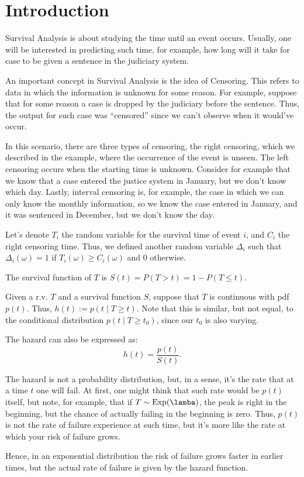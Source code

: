 \section{Introduction}

Survival Analysis is about studying the time until
an event occurs. Usually, one will be interested in
predicting such time, for example, how long will
it take for case to be given a sentence in the
judiciary system.

An important concept in Survival Analysis is the idea
of Censoring. This refers to data in which the information
is unknown for some reason. For example, suppose that
for some reason a case is dropped by the judiciary before
the sentence. Thus, the output for such case was ``censored''
since we can't observe when it would've occur.

In this scenario, there are three types of censoring,
the right censoring, which we described in the example,
where the occurrence of the event is unseen.
The left censoring occurs when the starting time is unknown.
Consider for example that we know that a case entered the
justice system in January, but we don't know which day.
Lastly, interval censoring is, for example,
the case in which we can only know the monthly information,
so we know the case entered in January, and it was sentenced
in December, but we don't know the day.

Let's denote $T_i$ the random variable for the survival time
of event $i$, and $C_i$ the right censoring time.
Thus, we defined another random variable $\Delta_i$
such that $\Delta_i(\omega) = 1$ if $T_i(\omega) \geq C_i(\omega)$
and 0 otherwise.

The survival function of $T$ is $S(t) = P(T>t) =1 - P(T\leq t)$.

\begin{definition}[Hazard]
	Given a r.v. $T$ and a survival function $S$,
	suppose that $T$ is continuous with pdf $p(t)$.
	Thus, $h(t):=p(t \mid T \geq t)$. Note that this
	is similar, but not equal, to the conditional
	distribution $p(t \mid T \geq t_0)$, since our
	$t_0$ is also varying.

	The hazard can also be expressed as:
	\begin{displaymath}
		h(t) = \frac{p(t)}{S(t)}.
	\end{displaymath}

\end{definition}

The hazard is not a probability distribution, but,
in a sense, it's the rate that at a time $t$ one will
fail. At first, one might think that such rate would
be $p(t)$ itself, but note, for example, that if
$T \sim \text{Exp(\lamba)}$, the peak is right in the
beginning, but the chance of actually failing in the
beginning is zero. Thus, $p(t)$ is not the rate of
failure experience at such time, but it's more like
the rate at which your risk of failure grows.

Hence, in an exponential distribution the risk of failure
grows faster in earlier times, but the actual rate of
failure is given by the hazard function.


